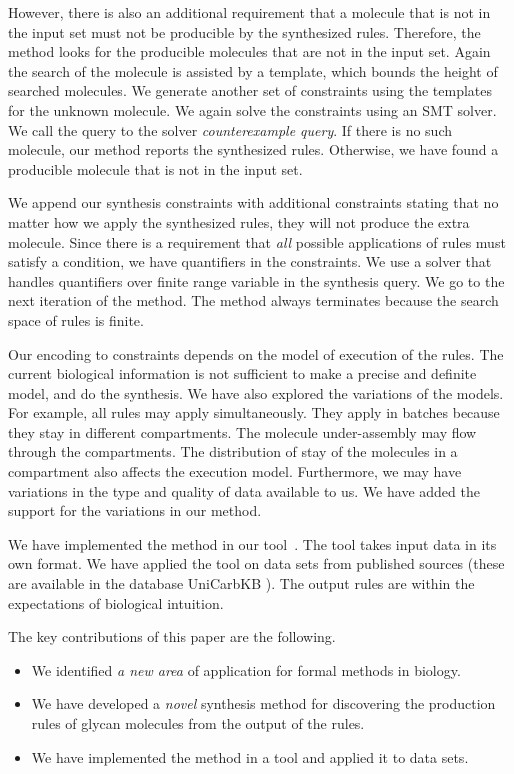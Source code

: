 However, there is also an additional requirement that a molecule
that is not in the input set must not be producible by the synthesized rules.
Therefore, the method looks for the producible molecules that are not in the input set.
Again the search of the molecule is assisted by a template, which bounds the height
of searched molecules.
We generate another set of constraints using the templates for the unknown molecule.
We again solve the constraints using an SMT solver.
We call the query to the solver {\em counterexample query}.
If there is no such molecule, our method reports
the synthesized rules.
Otherwise, we have found a producible molecule that is not in the input set.

We append our synthesis constraints with additional constraints stating that
no matter how we apply the synthesized rules, they will not produce the extra molecule.
Since there is a requirement that {\em all} possible applications of rules must satisfy
a condition, we have quantifiers in the constraints.
We use a solver that handles quantifiers over finite range variable in
the synthesis query.
We go to the next iteration of the method.
The method always terminates because the search space of rules is finite.

Our encoding to constraints depends on the model of execution of the rules.
The current biological information is not sufficient to make a precise
and definite model, and do the synthesis.
We have also explored the variations of the models. For example, all rules
may apply simultaneously. They apply in batches because they
stay in different compartments.
The molecule under-assembly may flow through the compartments.
The distribution of stay of the molecules in a compartment also affects
the execution model.
Furthermore, we may have variations in the type and quality of data available to us.
We have added the support for the variations in our method.

We have implemented the method in our tool~\ourtool. The tool takes input data in its own format.
We have applied the tool on data sets from published sources (these are available in the database UniCarbKB \cite{Campbell2013}).
The output rules are within the expectations of biological
intuition.

The key contributions of this paper are the following.
\begin{itemize}
\item We identified {\em a new area} of application for formal methods in biology.
\item We have developed a {\em novel} synthesis method for discovering the production rules of glycan molecules from the output of the rules.
\item We have implemented the method in a tool and applied it to data sets.
\end{itemize}



